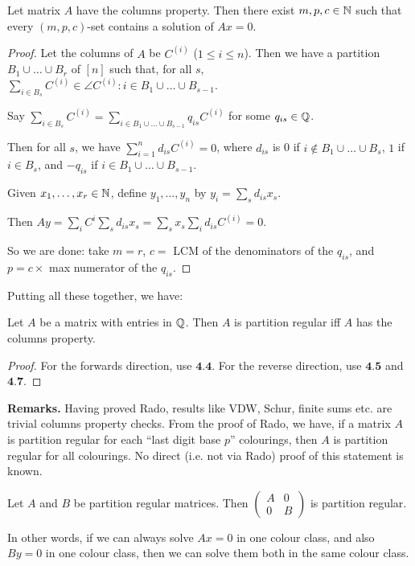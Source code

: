 \documentclass[10pt,a4paper]{article}
\begin{document}
\begin{proposition}
  Let matrix $A$ have the columns property. Then there exist $m,p,c \in \mathbb{N}$ such that every $(m,p,c)$-set contains a solution of $Ax = 0$.
\end{proposition}
\begin{proof}
  Let the columns of $A$ be $C^{(i)}$ ($1\leq i\leq n$). Then we have a partition $B_1 \cup \ldots \cup B_r$ of $[n]$ such that, for all $s$, $\sum_{i \in B_s}C^{(i)} \in \angle{C^{(i)} : i \in B_1\cup\ldots \cup B_{s-1}}$.

  Say $\sum_{i\in B_s}C^{(i)} = \sum_{i \in B_1\cup\ldots\cup B_{s-1}} q_{is}C^{(i)}$ for some $q_{is} \in \mathbb{Q}$.

  Then for all $s$, we have $\sum_{i=1}^n d_{is}C^{(i)} = 0$, where $d_{is}$ is 0 if $i \notin B_1 \cup \ldots \cup B_s$, $1$ if $i \in B_s$, and $-q_{is}$ if $i \in B_1 \cup \ldots \cup B_{s-1}$.

  Given $x_1, \ldots, x_r \in \mathbb{N}$, define $y_1, \ldots, y_n$ by $y_i = \sum_{s} d_{is}x_s$.

  Then $Ay = \sum_i C^{i} \sum_s d_{is}x_s = \sum_s x_s \sum_i d_{is}C^{(i)} = 0$.

  So we are done: take $m = r$, $c = $ LCM of the denominators of the $q_{is}$, and $p = c \times$ max numerator of the $q_{is}$.
\end{proof}
Putting all these together, we have:
\begin{theorem}[Rado]
  Let $A$ be a matrix with entries in $\mathbb{Q}$. Then $A$ is partition regular iff $A$ has the columns property.
\end{theorem}
\begin{proof}
  For the forwards direction, use $\textbf{4.4}$. For the reverse direction, use $\textbf{4.5}$ and $\textbf{4.7}$.
\end{proof}
\textbf{Remarks.} Having proved Rado, results like VDW, Schur, finite sums etc. are trivial columns property checks. From the proof of Rado, we have, if a matrix $A$ is partition regular for each ``last digit base $p$'' colourings, then $A$ is partition regular for all colourings. No direct (i.e. not via Rado) proof of this statement is known.
\begin{theorem}
  Let $A$ and $B$ be partition regular matrices. Then $\begin{pmatrix} A & 0 \\ 0 & B\end{pmatrix}$ is partition regular.

  In other words, if we can always solve $Ax=0$ in one colour class, and also $By=0$ in one colour class, then we can solve them both in the same colour class.
\end{theorem}
\end{document}
